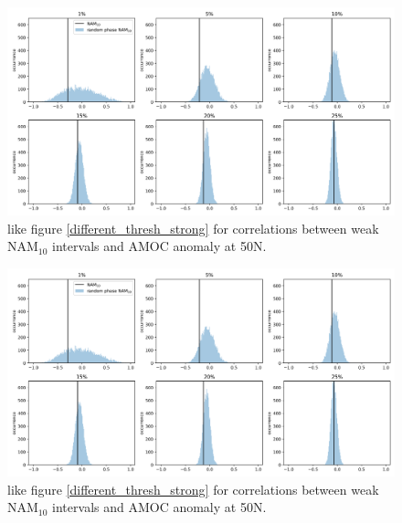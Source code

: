 \begin{figure}[h!]
\begin{center}
\noindent\includegraphics[width =\linewidth]{Figures/Figures-surface/bootstraps_different_threshold_weak.png} 
\caption{like figure \ref{different_thresh_strong} for correlations between weak NAM$_{10}$ intervals and AMOC anomaly at 50N.}
\label{different_thresh_weak}
\end{center}
\end{figure}

\begin{figure}[h!]
\begin{center}
\noindent\includegraphics[width =\linewidth]{Figures/Figures-surface/bootstraps_different_threshold_weak.png} 
\caption{like figure \ref{different_thresh_strong} for correlations between weak NAM$_{10}$ intervals and AMOC anomaly at 50N.}
\label{different_thresh_weak}
\end{center}
\end{figure}






